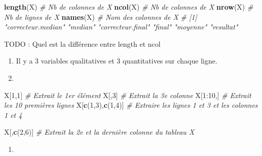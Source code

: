 \documentclass[
]{article}
\newenvironment{Shaded}{}{}
\newcommand{\CommentTok}[1]{\textcolor[rgb]{0.38,0.63,0.69}{\textit{#1}}}
\newcommand{\DecValTok}[1]{\textcolor[rgb]{0.25,0.63,0.44}{#1}}
\newcommand{\KeywordTok}[1]{\textcolor[rgb]{0.00,0.44,0.13}{\textbf{#1}}}
\newcommand{\NormalTok}[1]{#1}
\newcommand{\OperatorTok}[1]{\textcolor[rgb]{0.40,0.40,0.40}{#1}}
\newcommand{\StringTok}[1]{\textcolor[rgb]{0.25,0.44,0.63}{#1}}
\providecommand{\tightlist}{%
  \setlength{\itemsep}{0pt}\setlength{\parskip}{0pt}}
\begin{document}
\begin{Shaded}
\begin{Highlighting}[]
\KeywordTok{length}\NormalTok{(X) }\CommentTok{\# Nb de colonnes de X }
\KeywordTok{ncol}\NormalTok{(X) }\CommentTok{\# Nb de colonnes de X}
\KeywordTok{nrow}\NormalTok{(X) }\CommentTok{\# Nb de lignes de X}
\KeywordTok{names}\NormalTok{(X) }\CommentTok{\# Nom des colonnes de X}
\CommentTok{\# [1] "correcteur.median" "median"            "correcteur.final"  "final"             "moyenne"           "resultat"}
\end{Highlighting}
\end{Shaded}

TODO : Quel est la différence entre length et ncol

\begin{enumerate}
\def\labelenumi{\arabic{enumi}.}
\setcounter{enumi}{12}
\item
  Il y a 3 variables qualitatives et 3 quantitatives sur chaque ligne.
\item
\end{enumerate}

\begin{Shaded}
\begin{Highlighting}[]
\NormalTok{X[}\DecValTok{1}\NormalTok{,}\DecValTok{1}\NormalTok{] }\CommentTok{\# Extrait le 1er élément}
\NormalTok{X[,}\DecValTok{3}\NormalTok{] }\CommentTok{\# Extrait la 3e colonne}
\NormalTok{X[}\DecValTok{1}\OperatorTok{:}\DecValTok{10}\NormalTok{,] }\CommentTok{\# Extrait les 10 premières lignes}
\NormalTok{X[}\KeywordTok{c}\NormalTok{(}\DecValTok{1}\NormalTok{,}\DecValTok{3}\NormalTok{),}\KeywordTok{c}\NormalTok{(}\DecValTok{1}\NormalTok{,}\DecValTok{4}\NormalTok{)] }\CommentTok{\# Extraire les lignes 1 et 3 et les colonnes 1 et 4}

\NormalTok{X[,}\KeywordTok{c}\NormalTok{(}\DecValTok{2}\NormalTok{,}\DecValTok{6}\NormalTok{)] }\CommentTok{\# Extrait la 2e et la dernière colonne du tableau X}
\end{Highlighting}
\end{Shaded}

\begin{enumerate}
\def\labelenumi{\arabic{enumi}.}
\setcounter{enumi}{14}
\tightlist
\item
\end{enumerate}

\begin{Shaded}
\end{Shaded}
\end{document}
